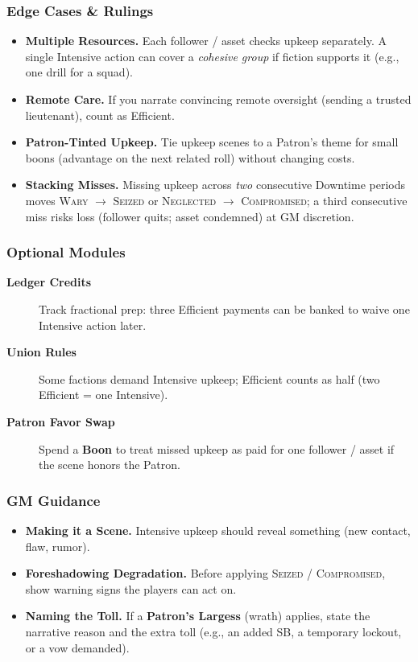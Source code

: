 \subsubsection{Edge Cases \& Rulings}\label{subsec:upkeep_edge}
\begin{itemize}
    \item \textbf{Multiple Resources.} Each follower / asset checks upkeep separately. A single Intensive action can cover a \emph{cohesive group} if fiction supports it (e.g., one drill for a squad).
    \item \textbf{Remote Care.} If you narrate convincing remote oversight (sending a trusted lieutenant), count as Efficient.
    \item \textbf{Patron-Tinted Upkeep.} Tie upkeep scenes to a Patron's theme for small boons (advantage on the next related roll) without changing costs.
    \item \textbf{Stacking Misses.} Missing upkeep across \emph{two} consecutive Downtime periods moves \textsc{Wary} $\rightarrow$ \textsc{Seized} or \textsc{Neglected} $\rightarrow$ \textsc{Compromised}; a third consecutive miss risks loss (follower quits; asset condemned) at GM discretion.
\end{itemize}

\subsubsection{Optional Modules}\label{subsec:upkeep_modules}

\begin{description}
    \item[\textbf{Ledger Credits}] Track fractional prep: three Efficient payments can be banked to waive one Intensive action later.
    \item[\textbf{Union Rules}] Some factions demand Intensive upkeep; Efficient counts as half (two Efficient = one Intensive).
    \item[\textbf{Patron Favor Swap}] Spend a \textbf{Boon} to treat missed upkeep as paid for one follower / asset if the scene honors the Patron.
\end{description}

\subsubsection{GM Guidance}\label{subsec:upkeep_gm}
\begin{itemize}
    \item \textbf{Making it a Scene.} Intensive upkeep should reveal something (new contact, flaw, rumor).
    \item \textbf{Foreshadowing Degradation.} Before applying \textsc{Seized} / \textsc{Compromised}, show warning signs the players can act on.
    \item \textbf{Naming the Toll.} If a \textbf{Patron's Largess} (wrath) applies, state the narrative reason and the extra toll (e.g., an added SB, a temporary lockout, or a vow demanded).
\end{itemize}

